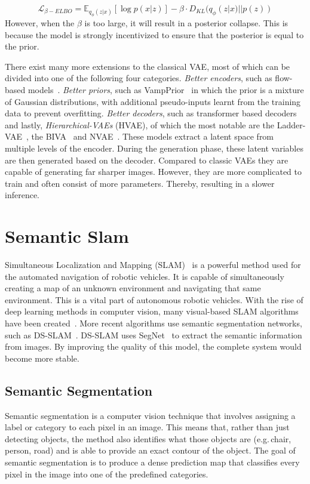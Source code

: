 \begin{equation}
    \mathcal{L}_{\beta-ELBO} = \mathbb{E}_{q_{\phi}(z|x)}[\log p(x|z)] - \beta \cdot D_{KL}(q_{\phi}(z|x) || p(z))
    \label{eq:beta-elbo}
\end{equation}
However, when the $\beta$ is too large, it will result in a posterior collapse. This is because the model is strongly incentivized to ensure that the posterior is equal to the prior.

There exist many more extensions to the classical VAE, most of which can be divided into one of the following four categories. \emph{Better encoders}, such as flow-based models~\cite{Berg2018SylvesterNF,tomczak2017improving,rezende2015variational}. \emph{Better priors}, such as VampPrior~\cite{tomczak2018vae} in which the prior is a mixture of Gaussian distributions, with additional pseudo-inputs learnt from the training data to prevent overfitting. \emph{Better decoders}, such as transformer based decoders~\cite{Henderson2022AVA,9054554} and lastly, \emph{Hierarchical-VAEs} (HVAE), of which the most notable are the Ladder-VAE~\cite{NIPS2016_6ae07dcb}, the BIVA~\cite{maaloe2019biva} and NVAE~\cite{vahdat2020nvae}. These models extract a latent space from multiple levels of the encoder. During the generation phase, these latent variables are then generated based on the decoder. Compared to classic VAEs they are capable of generating far sharper images. However, they are more complicated to train and often consist of more parameters. Thereby, resulting in a slower inference.


\section{Semantic Slam}
Simultaneous Localization and Mapping (SLAM)~\cite{chatila1985position} is a powerful method used for the automated navigation of robotic vehicles. It is capable of simultaneously creating a map of an unknown environment and navigating that same environment. This is a vital part of autonomous robotic vehicles. With the rise of deep learning methods in computer vision, many visual-based SLAM algorithms have been created~\cite{taketomi2017visual}. More recent algorithms use semantic segmentation networks, such as DS-SLAM~\cite{yu2018ds}. DS-SLAM uses SegNet~\cite{badri2017segnet} to extract the semantic information from images. By improving the quality of this model, the complete system would become more stable.

\subsection{Semantic Segmentation}
Semantic segmentation is a computer vision technique that involves assigning a label or category to each pixel in an image. This means that, rather than just detecting objects, the method also identifies what those objects are (e.g.\,chair, person, road) and is able to provide an exact contour of the object. The goal of semantic segmentation is to produce a dense prediction map that classifies every pixel in the image into one of the predefined categories.

